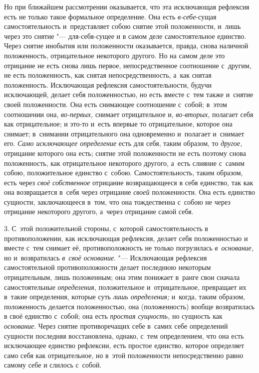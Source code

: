 Но при ближайшем рассмотрении оказывается, что эта исключающая рефлексия
есть не только такое формальное определение. Она есть
{\em в-себе}{}-сущая самостоятельность и~представляет
собою снятие этой положенности, и~лишь через это снятие "--- для-себя-сущее и
в самом деле самостоятельное единство. Через снятие инобытия или
положенности оказывается, правда, снова наличной положенность,
отрицательное некоторого другого. Но на самом деле это отрицание не есть
снова лишь первое, непосредственное соотношение с~другим, не есть
положенность, как снятая непосредственность, а~как снятая положенность.
Исключающая рефлексия самостоятельности, будучи исключающей, делает себя
положенностью, но есть вместе с~тем также и~снятие своей положенности. Она
есть снимающее соотношение с~собой; в~этом соотношении она,
{\em во-первых,} снимает отрицательное и,
{\em во-вторых,} полагает себя как отрицательное; и
это-то и~есть впервые то отрицательное, которое она снимает; в~снимании
отрицательного она одновременно и~полагает и~снимает его.
{\em Само исключающее определение} есть для себя, таким
образом, то {\em другое,} отрицание которого она есть;
снятие этой положенности не есть поэтому снова положенность, как
отрицательное некоторого другого, а~есть слияние с~самим собою,
положительное единство с~собою. Самостоятельность, таким образом, есть
через {\em своё собственное} отрицание возвращающееся в
себя единство, так как она возвращается в~себя через отрицание
{\em своей} положенности. Она есть единство сущности,
заключающееся в~том, что она тождественна с~собою не через отрицание
некоторого другого, а~через отрицание самой себя.

3. С~этой положительной стороны, с~которой самостоятельность в
противоположении, как исключающая рефлексия, делает себя положенностью и
вместе с~тем снимает её, противоположность не только погрузилась
{\em в~основание,} но и~возвратилась
{\em в~своё основание}. "--- Исключающая рефлексия
самостоятельной противоположности делает последнюю некоторым отрицательным,
лишь положенным; она этим понижает в~ранге свои сначала самостоятельные
{\em определения,} положительное и~отрицательное,
превращает их в~такие определения, которые суть
{\em лишь определения;} и~когда, таким образом,
положенность делается положенностью, она (положенность) вообще возвратилась
в своё единство с~собой; она есть {\em простая
сущность,} но сущность как {\em основание}. Через
снятие противоречащих себе в~самих себе определений сущности последняя
восстановлена, однако, с~тем определением, что она есть исключающее
единство рефлексии, есть простое единство, которое определяет само себя как
отрицательное, но в~этой положенности непосредственно равно самому себе и
слилось с~собой.

